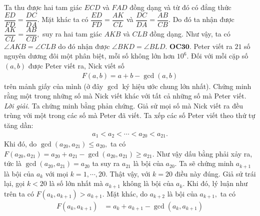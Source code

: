 \begin{multicols}{2}
\begin{figure}[H]
 		\vspace*{-5pt}
 	\end{figure}
	Ta thu được hai tam giác $ECD$ và $FAD$ đồng dạng và từ đó có đẳng thức $\dfrac{ED}{FD} = \dfrac{DC}{DA}.$ Mặt khác ta có $\dfrac{ED}{FD} = \dfrac{AK}{CL}$ và $\dfrac{DC}{DA}=\dfrac{AB}{CB}.$ Do đó ta nhận được $\dfrac{AK}{CL}=\dfrac{AB}{CB},$  suy ra hai tam giác $AKB$ và $CLB$ đồng dạng. 
	\vskip 0.1cm
	Như vậy, ta có $\angle AKB=\angle CLB$ do đó nhận được   $\angle BKD = \angle BLD.$
	\vskip 0.1cm
	{\bf\color{cackithi} OC$\pmb{30.}$} Peter viết ra $21$ số nguyên dương đôi một phân biệt, mỗi số không lớn hơn $10^6$. Đối với mỗi cặp số $(a, b)$ được Peter viết ra, Nick  viết  số
	\begin{align*}
		F(a, b) = a + b - \gcd (a, b)
	\end{align*}
	trên mảnh giấy của mình (ở đây $\gcd$ ký hiệu ước chung lớn nhất). 
	\vskip 0.1cm
	Chứng minh rằng một trong những số mà Nick viết khác với tất cả những  số mà Peter viết. 
	\vskip 0.1cm
	\textit{Lời giải.} Ta chứng minh bằng phản chứng. Giả sử mọi số mà Nick viết ra đều trùng với một trong các số mà Peter đã viết. Ta xếp các số Peter viết theo thứ tự tăng dần:
	\begin{align*}
		a_1 < a_2 < \cdots < a_{20} < a_{21}.
	\end{align*}
	Khi đó, do $\gcd (a_{20}, a_{21}) \le a_{20},$ ta có  $F(a_{20}, a_{21}) = a_{20} + a_{21} - \gcd (a_{20}, a_{21})\ge a_{21}.$ Như vậy dấu bằng phải xảy ra, tức là $\gcd (a_{20}, a_{21}) = a_{20}$ ta suy ra $a_{21}$ là bội của $a_{20}.$
	\vskip 0.1cm
	Ta sẽ chứng minh $a_{k+1}$ là bội của $a_k$ với mọi $k=1, \cdots, 20.$ Thật vậy, với $k=20$ điều này đúng. Giả sử trái lại, gọi $k<20$ là số lớn nhất mà $a_{k+1}$ không là bội của $a_k.$ Khi đó, lý luận như trên ta có $F(a_{k}, a_{k+1})>a_{k+1}$. Mặt khác, do $a_{k+2}$ là bội của $a_{k+1},$ ta có 
	\begin{align*}
		F(a_{k}, a_{k+1}) &= a_{k} + a_{k+1} - \gcd (a_{k}, a_{k+1})\\

\end{align*}
\end{multicols}
